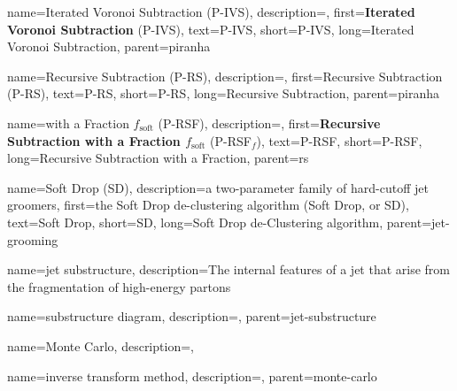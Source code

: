     {
        name=Iterated Voronoi Subtraction (P-IVS),
        description={},
        first={\textbf{Iterated Voronoi Subtraction} (P-IVS)},
        text={P-IVS},
        short={P-IVS},
        long={Iterated Voronoi Subtraction},
        parent=piranha
    }

    {
        name=Recursive Subtraction (P-RS),
        description={},
        first={Recursive Subtraction (P-RS)},
        text={P-RS},
        short={P-RS},
        long={Recursive Subtraction},
        parent=piranha
    }

    {
        name=with a Fraction \(f_\text{soft}\) (P-RSF),
        description={},
        first={\textbf{Recursive Subtraction with a Fraction \(f_\text{soft}\)} (P-RSF\(_f\))},
        text={P-RSF},
        short={P-RSF},
        long={Recursive Subtraction with a Fraction},
        parent=rs
    }


    {
        name=Soft Drop (SD),
        description={a two-parameter family of hard-cutoff jet groomers},
        first={the Soft Drop de-clustering algorithm (Soft Drop, or SD)},
        text={Soft Drop},
        short={SD},
        long={Soft Drop de-Clustering algorithm},
        parent=jet-grooming
    }



{
  name=jet substructure,
  description={The internal features of a jet that arise from the fragmentation of high-energy partons}
}

    {
      name=substructure diagram,
      description={},
      parent=jet-substructure
    }






{
    name=Monte Carlo,
    description={},
}

    {
        name=inverse transform method,
        description={},
        parent=monte-carlo
    }




